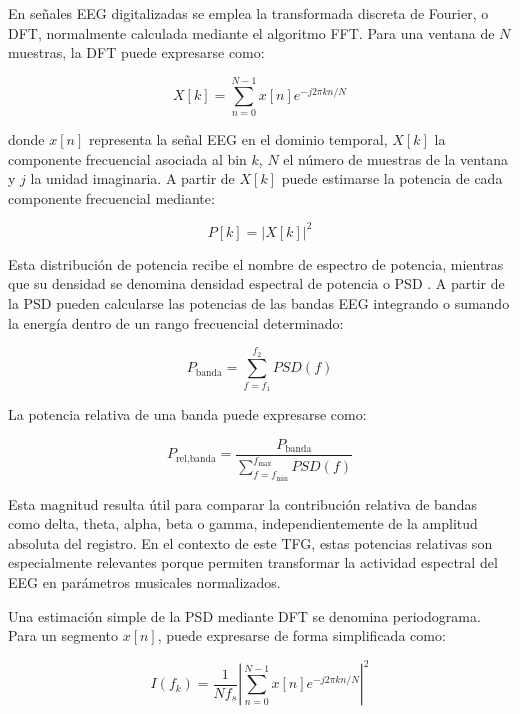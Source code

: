 \documentclass[../main.tex]{subfiles}
\begin{document}
En señales EEG digitalizadas se emplea la transformada discreta de Fourier, o DFT, normalmente calculada mediante el algoritmo FFT. Para una ventana de \(N\) muestras, la DFT puede expresarse como:

\begin{equation}
    X[k] =
    \sum_{n=0}^{N-1}
    x[n] e^{-j2\pi kn/N}
    \label{eq:dft}
\end{equation}

donde \(x[n]\) representa la señal EEG en el dominio temporal, \(X[k]\) la componente frecuencial asociada al bin \(k\), \(N\) el número de muestras de la ventana y \(j\) la unidad imaginaria. A partir de \(X[k]\) puede estimarse la potencia de cada componente frecuencial mediante:

\begin{equation}
    P[k] = |X[k]|^2
    \label{eq:power_spectrum}
\end{equation}

Esta distribución de potencia recibe el nombre de espectro de potencia, mientras que su densidad se denomina densidad espectral de potencia o PSD \cite{Sawa2022}. A partir de la PSD pueden calcularse las potencias de las bandas EEG integrando o sumando la energía dentro de un rango frecuencial determinado:

\begin{equation}
    P_{\text{banda}} =
    \sum_{f=f_1}^{f_2} PSD(f)
    \label{eq:bandpower}
\end{equation}

La potencia relativa de una banda puede expresarse como:

\begin{equation}
    P_{\text{rel,banda}} =
    \frac{
    P_{\text{banda}}
    }{
    \sum_{f=f_{\min}}^{f_{\max}} PSD(f)
    }
    \label{eq:relative_bandpower}
\end{equation}

Esta magnitud resulta útil para comparar la contribución relativa de bandas como delta, theta, alpha, beta o gamma, independientemente de la amplitud absoluta del registro. En el contexto de este TFG, estas potencias relativas son especialmente relevantes porque permiten transformar la actividad espectral del EEG en parámetros musicales normalizados.

Una estimación simple de la PSD mediante DFT se denomina periodograma. Para un segmento \(x[n]\), puede expresarse de forma simplificada como:

\begin{equation}
    I(f_k) =
    \frac{1}{N f_s}
    \left|
    \sum_{n=0}^{N-1}
    x[n]e^{-j2\pi kn/N}
    \right|^2
    \label{eq:periodogram}
\end{equation}
\end{document}
